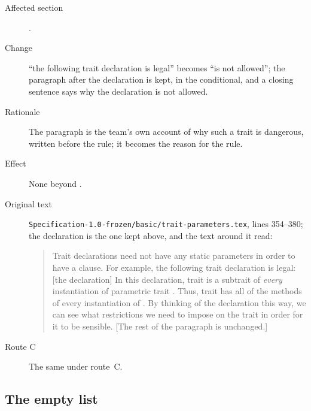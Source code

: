\begin{description}
\item[Affected section] .
\item[Change] ``the following trait declaration is legal'' becomes
``is not allowed''; the paragraph after the declaration is kept, in the
conditional, and a closing sentence says why the declaration is not
allowed.
\item[Rationale] The paragraph is the team's own account of why such a
trait is dangerous, written before the rule; it becomes the reason for the
rule.
\item[Effect] None beyond .
\item[Original text] \nolinkurl{Specification-1.0-frozen/basic/trait-parameters.tex},
lines 354--380; the declaration is the one kept above, and the text around
it read:
\begin{quote}
Trait declarations need not have any static parameters in order
to have a  clause. For example, the following trait
declaration is legal:
[the declaration]
In this declaration, trait  is a subtrait of \emph{every}
instantiation of parametric trait . Thus, trait  has all
of the methods of every instantiation of . By thinking of the
declaration this way, we can see what restrictions we need to impose on
the trait  in order for it to be sensible. [The rest of the
paragraph is unchanged.]
\end{quote}
\item[Route C] The same under route~C.
\end{description}

\subsection{The empty list}

